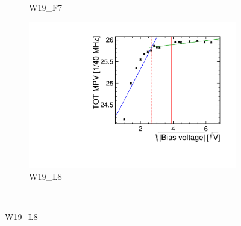 \begin{figure}[htbp]
\begin{subfigure}[b]{0.33\textwidth}
    \caption{W19\_F7}
  \end{subfigure}\hfill
  \begin{subfigure}[b]{0.33\textwidth}
    \includegraphics[width=\textwidth]{./figures/TestBeam/depletionVoltage_W0019_L08.pdf}
    \caption{W19\_L8}
  \end{subfigure} \\


\end{figure}
